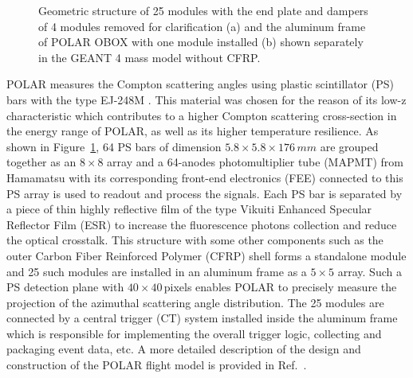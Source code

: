 \documentclass[preprint,sort&compress,12pt]{elsarticle}
\begin{document}
\begin{figure}[!ht]
\centering
{}
\hspace{2mm}
\caption{Geometric structure of 25 modules with the end plate and dampers of 4 modules removed for clarification (a) and the aluminum frame of POLAR OBOX with one module installed (b) shown separately in the GEANT 4 mass model without CFRP.}
\label{fig:obox_geo_struct}
\end{figure}

POLAR measures the Compton scattering angles using plastic scintillator (PS) bars with the type EJ-248M \cite{EJ248M}. This material was chosen for the reason of its low-z characteristic which contributes to a higher Compton scattering cross-section in the energy range of POLAR, as well as its higher temperature resilience. As shown in Figure~\ref{fig:obox_geo_struct}, 64 PS bars of dimension $5.8\times 5.8 \times 176\,mm$ are grouped together as an $8 \times 8$ array and a 64-anodes photomultiplier tube (MAPMT) from Hamamatsu with its corresponding front-end electronics (FEE) connected to this PS array is used to readout and process the signals. Each PS bar is separated by a piece of thin highly reflective film of the type Vikuiti Enhanced Specular Reflector Film (ESR) \cite{3M} to increase the fluorescence photons collection and reduce the optical crosstalk. This structure with some other components such as the outer Carbon Fiber Reinforced Polymer (CFRP) shell forms a standalone module and 25 such modules are installed in an aluminum frame as a $5 \times 5$ array. Such a PS detection plane with $40 \times 40$\,pixels enables POLAR to precisely measure the projection of the azimuthal scattering angle distribution. The 25 modules are connected by a central trigger (CT) system installed inside the aluminum frame which is responsible for implementing the overall trigger logic, collecting and packaging event data, etc. A more detailed description of the design and construction of the POLAR flight model is provided in Ref.~\cite{Produit2017}. 
\end{document}
